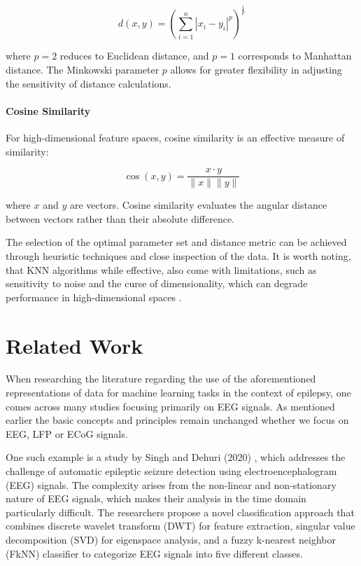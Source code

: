 \documentclass{article}
\begin{document}
\[
d(x, y) = \left( \sum_{i=1}^n |x_i - y_i|^p \right)^{\frac{1}{p}}
\]

where \( p = 2 \) reduces to Euclidean distance, and \( p = 1 \) corresponds to Manhattan distance. The Minkowski parameter \( p \) allows for greater flexibility in adjusting the sensitivity of distance calculations.

\paragraph{Cosine Similarity}

For high-dimensional feature spaces, cosine similarity is an effective measure of similarity:

\[
\cos(x, y) = \frac{x \cdot y}{\|x\| \|y\|}
\]

where \( x \) and \( y \) are vectors. Cosine similarity evaluates the angular distance between vectors rather than their absolute difference.

The selection of the optimal parameter set and distance metric can be achieved through heuristic techniques and close inspection of the data. It is worth noting, that KNN algorithms while effective, also come with limitations, such as sensitivity to noise and the curse of dimensionality, which can degrade performance in high-dimensional spaces \cite{ding2017, triguero2019}.

\section{Related Work}
When researching the literature regarding the use of the aforementioned representations of data for machine learning tasks in the context of epilepsy, one comes across many studies focusing primarily on EEG signals. As mentioned earlier the basic concepts and principles remain unchanged whether we focus on EEG, LFP or ECoG signals.

One such example is a study by Singh and Dehuri (2020) \cite{singh2020}, which addresses the challenge of automatic epileptic seizure detection using electroencephalogram (EEG) signals. The complexity arises from the non-linear and non-stationary nature of EEG signals, which makes their analysis in the time domain particularly difficult. The researchers propose a novel classification approach that combines discrete wavelet transform (DWT) for feature extraction, singular value decomposition (SVD) for eigenspace analysis, and a fuzzy k-nearest neighbor (FkNN) classifier to categorize EEG signals into five different classes.
\end{document}
